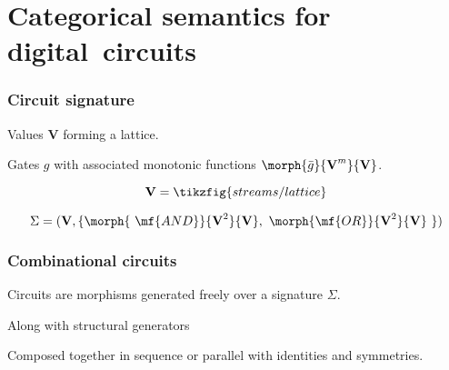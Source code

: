 \section{Categorical semantics for digital~circuits}

\begin{frame}
    \frametitle{Circuit signature}

    \pause

    \alert{Values} $\textbf{V}$ forming a lattice.

    \pause

    \alert{Gates} $g$ with associated monotonic functions $\morph{\bar{g}}{\textbf{V}^m}{\textbf{V}}$.


    \pause

    \[\textbf{V} = \tikzfig{streams/lattice}\]

    \pause

    \[\Sigma = (\textbf{V}, \{\morph{\ \mf{AND}}{\textbf{V}^2}{\textbf{V}},\ \morph{\mf{OR}}{\textbf{V}^2}{\textbf{V}}\ \})\]

\end{frame}

\begin{frame}
    \frametitle{Combinational circuits}

    \pause

    Circuits are morphisms generated freely over a signature $\Sigma$.

    \begin{center}

        \pause

        \vspace{1em}

    \end{center}

    \vspace{1em}

    \pause

    Along with \alert{structural} generators 

    \begin{center}
        \quad
        \quad
    \end{center}

    Composed together in sequence or parallel with \alert{identities} and \alert{symmetries}.

\end{frame}

